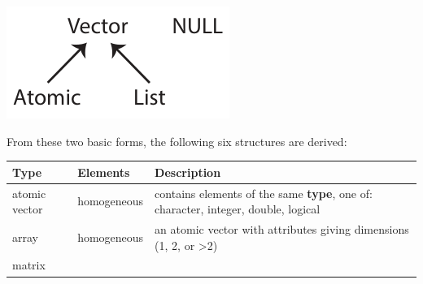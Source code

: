 \documentclass[]{book}
\begin{document}
\includegraphics{R/RDataWrangling/images/summary_tree.png}

From these two basic forms, the following six structures are derived:

\begin{longtable}[]{@{}lll@{}}
\toprule
\begin{minipage}[b]{0.10\columnwidth}\raggedright\strut
Type\strut
\end{minipage} & \begin{minipage}[b]{0.10\columnwidth}\raggedright\strut
Elements\strut
\end{minipage} & \begin{minipage}[b]{0.71\columnwidth}\raggedright\strut
Description\strut
\end{minipage}\tabularnewline
\midrule
\endhead
\begin{minipage}[t]{0.10\columnwidth}\raggedright\strut
atomic vector\strut
\end{minipage} & \begin{minipage}[t]{0.10\columnwidth}\raggedright\strut
homogeneous\strut
\end{minipage} & \begin{minipage}[t]{0.71\columnwidth}\raggedright\strut
contains elements of the same \textbf{type}, one of: character, integer,
double, logical\strut
\end{minipage}\tabularnewline
\begin{minipage}[t]{0.10\columnwidth}\raggedright\strut
array\strut
\end{minipage} & \begin{minipage}[t]{0.10\columnwidth}\raggedright\strut
homogeneous\strut
\end{minipage} & \begin{minipage}[t]{0.71\columnwidth}\raggedright\strut
an atomic vector with attributes giving dimensions (1, 2, or
\textgreater{}2)\strut
\end{minipage}\tabularnewline
\begin{minipage}[t]{0.10\columnwidth}\raggedright\strut
matrix\strut
\end{minipage} & \begin{minipage}[t]{0.10\columnwidth}\raggedright\strut

\end{minipage}
\end{longtable}
\end{document}
